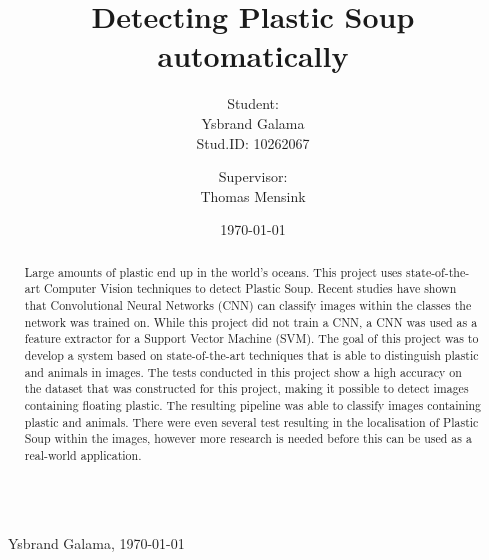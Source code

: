 \documentclass[a4paper, 11pt]{article}
\title{Detecting Plastic Soup automatically}
\author{Student:\\Ysbrand Galama \\ Stud.ID: 10262067 \and Supervisor:\\ Thomas Mensink }
\date{\today}
\begin{document}

\ifx\showintro\undefined

\thispagestyle{empty}
$\,$
\vfill
\begin{abstract}
Large amounts of plastic end up in the world's oceans.
This project uses state-of-the-art Computer Vision techniques to detect Plastic Soup.
Recent studies have shown that Convolutional Neural Networks (CNN) can classify images within the classes the network was trained on.
While this project did not train a CNN, a CNN was used as a feature extractor for a Support Vector Machine (SVM).
The goal of this project was to develop a system based on state-of-the-art techniques that is able to distinguish plastic and animals in images.
The tests conducted in this project show a high accuracy on the dataset that was constructed for this project, making it possible to detect images containing floating plastic.
The resulting pipeline was able to classify images containing plastic and animals.
There were even several test resulting in the localisation of Plastic Soup within the images, however more research is needed before this can be used as a real-world application.
\end{abstract}
\vfill
\vfill
$\,$
\newpage
\tableofcontents
\newpage
\else
{}\\ \mbox{}~\hfill{Ysbrand Galama, \today}
\fi




\ifx\showpbreak\undefined \clearpage \fi


\ifx\showpbreak\undefined \clearpage \fi


\ifx\showpbreak\undefined \newpage \fi







\end{document}
